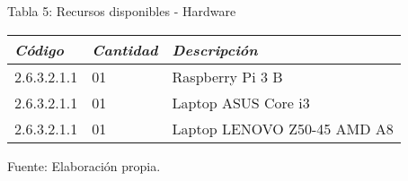             \begin{table}[h!]
                \centering
                { Tabla 5: Recursos disponibles - Hardware}\par
                \begin{tabular}{|p{3cm}|p{2cm}|p{5cm}|} \hline
                    
                
                \textit{{\bf{Código}}} &
                \textit{{\bf{Cantidad}}} &
                \textit{{\bf{Descripción}}}
                \\ \hline

                2.6.3.2.1.1 &
                01 &
                Raspberry Pi 3 B
                \\ \hline

                2.6.3.2.1.1 &
                01 &
                Laptop ASUS Core i3
                \\ \hline

                2.6.3.2.1.1&
                01 &
                Laptop LENOVO Z50-45 AMD A8
                \\ \hline

                \end{tabular}
                \begin{center}
                    \vskip -0.2cm
                    {\small{Fuente: Elaboración propia.}}
                \end{center}
            \end{table}

\newpage


